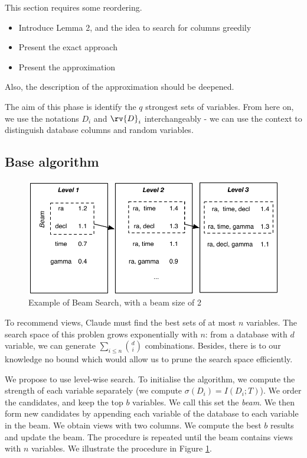 {\color{red} 
This section requires some reordering.
\begin{itemize}
    \item Introduce Lemma 2, and the idea to search for columns greedily
    \item Present the exact approach
    \item Present the approximation
\end{itemize}
Also, the description of the approximation should be deepened.
}

The aim of this phase is identify the $q$ strongest sets of variables. From
here on, we use the notations $D_i$ and $\rv{D}_i$ interchangeably - we can use
the context to distinguish database columns and random variables.

\subsection{Base algorithm}
\begin{figure}[t!]
\centering
\includegraphics[width=0.8\columnwidth]{images/beam-search}
\caption{Example of Beam Search, with a beam size of 2}
\label{pic:beam-search}
\end{figure}

To recommend views, Claude must find the best sets of at most $n$ variables.
The search space of this problen grows exponentially with $n$: from a database
with $d$ variable, we can generate $\sum_{i \leq n} \binom{d}{i}$ combinations.
Besides, there is to our knowledge no bound which would allow us to prune the
search space efficiently. 

We propose to use level-wise search. To initialise the algorithm, we compute
the strength of each variable separately (we compute $\sigma(D_i) = I(D_i;
T)$). We order the candidates, and keep the top $b$ variables. We call this set
the \emph{beam}. We then form new candidates by appending each variable of the
database to each variable in the beam. We obtain views with two columns. We
compute the best $b$ results and update the beam. The procedure is repeated
until the beam contains views with $n$ variables. We illustrate the procedure
in Figure \ref{pic:beam-search}.

